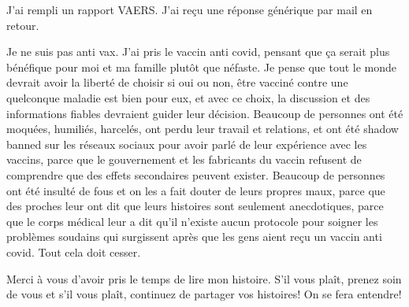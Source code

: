 {J'ai rempli un rapport VAERS. J'ai reçu une réponse générique par mail en retour.

Je ne suis pas anti vax. J'ai pris le vaccin anti covid, pensant que ça serait
plus bénéfique pour moi et ma famille plutôt que néfaste. Je pense que tout le
monde devrait avoir la liberté de choisir si oui ou non, être vacciné contre une
quelconque maladie est bien pour eux, et avec ce choix, la discussion et des
informations fiables devraient guider leur décision. Beaucoup de personnes ont
été moquées, humiliés, harcelés, ont perdu leur travail et relations, et ont été
shadow banned sur les réseaux sociaux pour avoir parlé de leur expérience avec
les vaccins, parce que le gouvernement et les fabricants du vaccin refusent de
comprendre que des effets secondaires peuvent exister. Beaucoup de personnes ont
été insulté de fous et on les a fait douter de leurs propres maux, parce que des
proches leur ont dit que leurs histoires sont seulement anecdotiques, parce que
le corps médical leur a dit qu'il n'existe aucun protocole pour soigner les
problèmes soudains qui surgissent après que les gens aient reçu un vaccin anti
covid. Tout cela doit cesser.

Merci à vous d'avoir pris le temps de lire mon histoire. S'il vous plaît, prenez
soin de vous et s'il vous plaît, continuez de partager vos histoires! On se fera
entendre!

}
